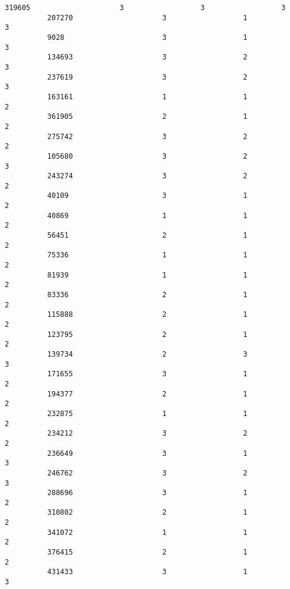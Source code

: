 \documentclass[11pt]{article}
\begin{document}
\begin{Verbatim}[commandchars=\\\{\}]
          319605                     3                  3                  3   
          207270                     3                  1                  3   
          9028                       3                  1                  3   
          134693                     3                  2                  3   
          237619                     3                  2                  3   
          163161                     1                  1                  2   
          361905                     2                  1                  2   
          275742                     3                  2                  2   
          105680                     3                  2                  3   
          243274                     3                  2                  2   
          40109                      3                  1                  2   
          40869                      1                  1                  2   
          56451                      2                  1                  2   
          75336                      1                  1                  2   
          81939                      1                  1                  2   
          83336                      2                  1                  2   
          115888                     2                  1                  2   
          123795                     2                  1                  2   
          139734                     2                  3                  3   
          171655                     3                  1                  2   
          194377                     2                  1                  2   
          232875                     1                  1                  2   
          234212                     3                  2                  2   
          236649                     3                  1                  3   
          246762                     3                  2                  3   
          288696                     3                  1                  2   
          310802                     2                  1                  2   
          341072                     1                  1                  2   
          376415                     2                  1                  2   
          431433                     3                  1                  3   
          

\end{Verbatim}
\end{document}
